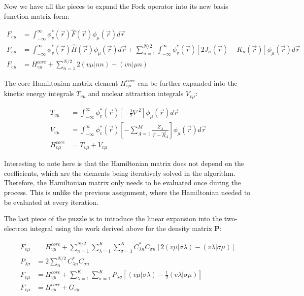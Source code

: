 \documentclass[10pt, oneside, letterpaper]{article}
\begin{document}
Now we have all the pieces to expand the Fock operator into its new basis function matrix form:

\begin{align*}
  F_{v\mu} &= \int_{-\infty}^{\infty} \phi_v^\ast(\vec{r}) \hat{F}(\vec{r}) \phi_\mu(\vec{r})d\vec{r} \\
  F_{v\mu} &= \int_{-\infty}^{\infty} \phi_v^\ast(\vec{r}) \hat{H}(\vec{r}) \phi_\mu(\vec{r})d\vec{r} + \sum_{n=1}^{N/2} \int_{-\infty}^{\infty} \phi_v^\ast(\vec{r}) \left[2J_n(\vec{r}) - K_n(\vec{r})\right] \phi_\mu(\vec{r})d\vec{r} \\
  F_{v\mu} &= H_{v\mu}^{core} + \sum_{n=1}^{N/2} 2(v\mu|nn) - (vn|\mu n)
\end{align*}

The core Hamiltonian matrix element $H_{v\mu}^{core}$ can be further expanded into the kinetic energy integrals $T_{v\mu}$ and nuclear attraction integrals $V_{v\mu}$:

\begin{align*}
  T_{v\mu} &= \int_{-\infty}^{\infty} \phi_v^\ast(\vec{r}) \left[ -\frac{1}{2}\nabla^2 \right] \phi_\mu(\vec{r})d\vec{r} \\
  V_{v\mu} &= \int_{-\infty}^{\infty} \phi_v^\ast(\vec{r}) \left[ -\sum_{A=1}^{M}\frac{Z_A}{\vec{r} - \vec{R}_A} \right] \phi_\mu(\vec{r})d\vec{r} \\
  H_{v\mu}^{core} &= T_{v\mu} + V_{v\mu}
\end{align*}

Interesting to note here is that the Hamiltonian matrix does not depend on the coefficients, which are the elements being iteratively solved in the algorithm. Therefore, the Hamiltonian matrix only needs to be evaluated once during the process. This is unlike the previous assignment, where the Hamiltonian needed to be evaluated at every iteration.

The last piece of the puzzle is to introduce the linear expansion into the two-electron integral using the work derived above for the density matrix $\bm{P}$:

\begin{align*}
  F_{v\mu} &= H_{v\mu}^{core} + \sum_{n=1}^{N/2} \sum_{\lambda = 1}^K\sum_{\sigma = 1}^K C_{\lambda n}^\ast C_{\sigma n} \left[ 2(v\mu|\sigma\lambda) - (v\lambda|\sigma\mu) \right] \\
  P_{\lambda\sigma} &= 2 \sum_{n}^{N/2} C_{\lambda n}^\ast C_{\sigma n} \\
  F_{v\mu} &= H_{v\mu}^{core} + \sum_{\lambda = 1}^K\sum_{\sigma = 1}^K P_{\lambda\sigma} \left[ (v\mu|\sigma\lambda) - \frac{1}{2}(v\lambda|\sigma\mu) \right] \\
  F_{v\mu} &= H_{v\mu}^{core} + G_{v\mu}
\end{align*}
\end{document}
